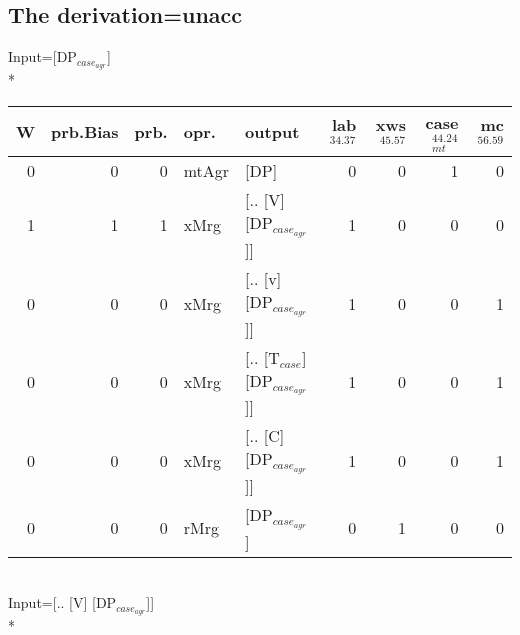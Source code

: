 \subsection{The derivation=unacc}
\begingroup\scriptsize Input=[DP$_{case_{agr}}$]\\*
\begin{tabularx}{\linewidth}{rrrlXrrrr}
\hline
   W &   prb.Bias &   prb. & opr.    & output                      &   lab$^{34.37}$ &   xws$^{45.57}$ &   case$_{mt}^{44.24}$ &   mc$^{56.59}$ \\
\hline
   0 &       0 &   0 & mtAgr & [DP]                        &             0 &             0 &                 1 &            0 \\
   1 &       1 &   1 & xMrg  & [.. [V] [DP$_{case_{agr}}$]]      &             1 &             0 &                 0 &            0 \\
   0 &       0 &   0 & xMrg  & [.. [v] [DP$_{case_{agr}}$]]      &             1 &             0 &                 0 &            1 \\
   0 &       0 &   0 & xMrg  & [.. [T$_{case}$] [DP$_{case_{agr}}$]] &             1 &             0 &                 0 &            1 \\
   0 &       0 &   0 & xMrg  & [.. [C] [DP$_{case_{agr}}$]]      &             1 &             0 &                 0 &            1 \\
   0 &       0 &   0 & rMrg  & [DP$_{case_{agr}}$]               &             0 &             1 &                 0 &            0 \\
\hline
\end{tabularx}\endgroup\\
\begingroup\scriptsize Input=[.. [V] [DP$_{case_{agr}}$]]\\*
